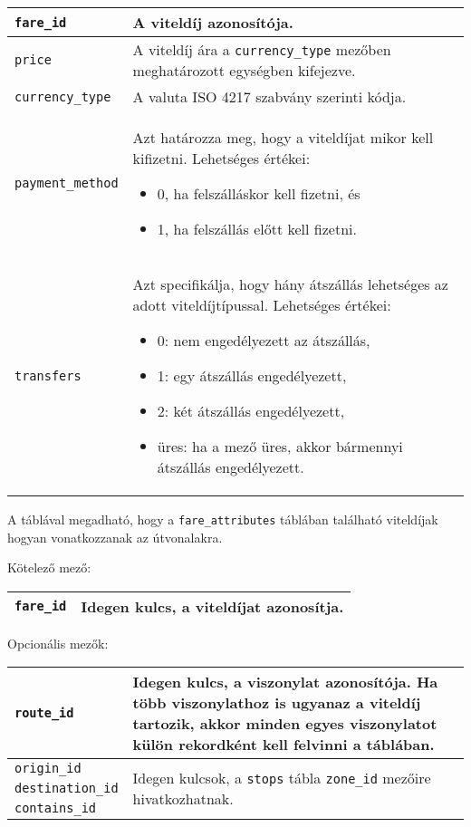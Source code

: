 \begin{tabular}{|p{3.5cm}|p{10cm}|}
\hline
\texttt{fare\_id} & A viteldíj azonosítója. \\
\hline
\texttt{price} & A viteldíj ára a \texttt{currency\_type} mezőben meghatározott egységben kifejezve. \\
\hline
\texttt{currency\_type} & A valuta ISO 4217 szabvány szerinti kódja. \\
\hline
\texttt{payment\_method} & Azt határozza meg, hogy a viteldíjat mikor kell kifizetni.
Lehetséges értékei:
\begin{itemize}
\item 0, ha felszálláskor kell fizetni, és
\item 1, ha felszállás előtt kell fizetni.
\end{itemize}
\\
\hline
\texttt{transfers} & Azt specifikálja, hogy hány átszállás lehetséges az adott viteldíjtípussal.
Lehetséges értékei:
\begin{itemize}
\item 0: nem engedélyezett az átszállás,
\item 1: egy átszállás engedélyezett,
\item 2: két átszállás engedélyezett,
\item üres: ha a mező üres, akkor bármennyi átszállás engedélyezett.
\end{itemize}
\\
\hline
\end{tabular}


A táblával megadható, hogy a \texttt{fare\_attributes} táblában található viteldíjak hogyan vonatkozzanak az útvonalakra.

\newpage

\noindent Kötelező mező:

\bigskip

\begin{tabular}{|p{3cm}|p{10cm}|}
\hline
\texttt{fare\_id} & Idegen kulcs, a viteldíjat azonosítja. \\
\hline
\end{tabular}

\bigskip

\noindent Opcionális mezők:

\bigskip



\begin{tabular}{|p{3.5cm}|p{9.5cm}|}
\hline
\texttt{route\_id} & Idegen kulcs, a viszonylat azonosítója. Ha több viszonylathoz is ugyanaz a viteldíj tartozik, akkor minden egyes viszonylatot külön rekordként kell felvinni a táblában. \\
\hline
\texttt{origin\_id} & \multirow{3}{10cm}{Idegen kulcsok, a \texttt{stops} tábla \texttt{zone\_id} mezőire hivatkozhatnak.} \\
\cline{1-1}
\texttt{destination\_id} & \\
\cline{1-1}
\texttt{contains\_id} & \\
\hline
\end{tabular}

